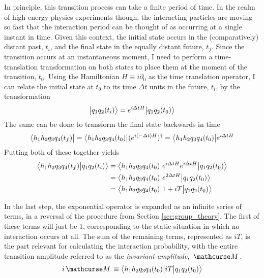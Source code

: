     In principle, this transition process can take a finite period of time.
    In the realm of high energy physics experiments though,
        the interacting particles are moving so fast that the interaction period can be thought of as occurring at a single instant in time.
    Given this context, the initial state occurs in the (comparatively) distant past, $t_i$, and the final state in the equally distant future, $t_f$.
    Since the transition occurs at an instantaneous moment,
        I need to perform a time-translation transformation on both states to place them at the moment of the transition, $t_0$.
    Using the Hamiltonian $H \equiv i\partial_0$ as the time translation operator,
        I can relate the initial state at $t_0$ to its time $\Delta t$ units in the future, $t_i$, by the transformation
    \begin{equation}
        \big| q_{1} q_{2} (t_i) \big> = e^{i\Delta tH}\big| q_{1} q_{2} (t_0) \big>
    \end{equation}
    The same can be done to transform the final state backwards in time
    \begin{equation}
        \big< h_1 h_2 q_{3} q_{4} (t_f) \big|
        = \big< h_1 h_2 q_{3} q_{4} (t_0) \big| (e^{i(-\Delta t)H})^\dag
        = \big< h_1 h_2 q_{3} q_{4} (t_0) \big| e^{i\Delta tH}
    \end{equation}
    Putting both of these together yields
    \begin{equation} \begin{split} \label{eq:transition_amplitude}
        \big<  h_1 h_2 q_{3} q_{4} (t_f) \big| q_{1} q_{2} (t_i) \big>
        &= \big<  h_1 h_2 q_{3} q_{4} (t_0) \big| e^{i\Delta tH} e^{i\Delta tH} \big| q_{1} q_{2} (t_0) \big>
        \\&= \big<  h_1 h_2 q_{3} q_{4} (t_0) \big| e^{2\Delta tH} \big| q_{1} q_{2} (t_0) \big>
        \\&= \big<  h_1 h_2 q_{3} q_{4} (t_0) \big| 1 + iT \big| q_{1} q_{2} (t_0) \big>
    \end{split} \end{equation}

    In the last step, the exponential operator is expanded as an infinite series of terms,
        in a reversal of the procedure from Section \ref{sec:group_theory}.
    The first of these terms will just be 1, corresponding to the static situation in which no interaction occurs at all.
    The sum of the remaining terms, represented as $iT$, is the part relevant for calculating the interaction probability,
        with the entire transition amplitude referred to as the \textit{invariant amplitude}, $\invAmp$.
    \begin{equation}
        i\invAmp \equiv \TbraketA{ h_1 h_2 q_{3} q_{4} (t_0)}{iT}{q_{1} q_{2} (t_0)}
    \end{equation}

